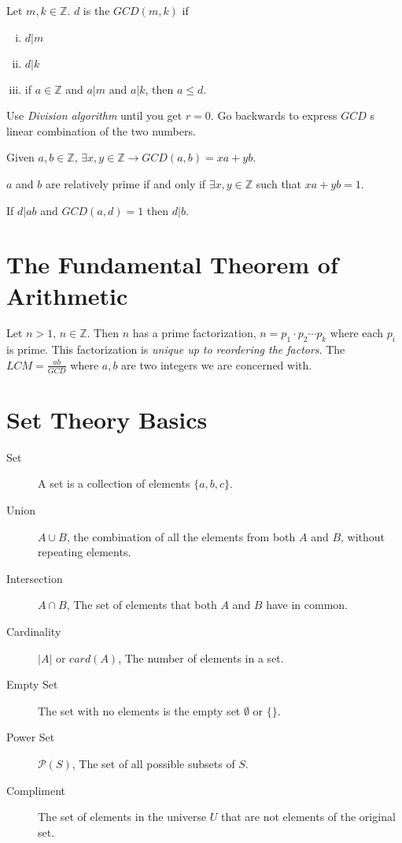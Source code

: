 \documentclass[../main.tex]{subfiles}
\begin{document}
\begin{description}
  \item[Definition] Let $m,k\in\mathbb{Z}$. $d$ is the $GCD(m,k)$ if
    \begin{enumerate}[(i)]
      \item $d|m$
      \item $d|k$
      \item if $a\in\mathbb{Z}$ and $a|m$ and $a|k$, then $a \leq d$.
    \end{enumerate}
  \item[Euclidean Algorithm] Use \textit{Division algorithm} until you get
    $r=0$. Go backwards to express $GCD$ s linear combination of the two
    numbers.
  \item[GCD pre-hammer] Given $a,b\in\mathbb{Z}$, $\exists x,y\in\mathbb{Z}\to
    GCD(a,b)=xa+yb$.
  \item[GCD hammer] $a$ and $b$ are relatively prime if and only if $\exists
    x,y\in\mathbb{Z}$ such that $xa+yb=1$.
  \item If $d|ab$ and $GCD(a,d)=1$ then $d|b$.
\end{description}

\section{The Fundamental Theorem of Arithmetic}
\label{sec:the_fundamental_theorem_of_arithmetic}

Let $n>1$, $n\in\mathbb{Z}$. Then $n$ has a prime factorization, $n=p_1\cdot
p_2\cdots p_k$ where each $p_i$ is prime. This factorization is \textit{unique
up to reordering the factors}. The $LCM = \frac{ab}{GCD}$ where $a,b$ are two
integers we are concerned with.

\section{Set Theory Basics}
\label{sec:set_theory_basics}

\begin{description}
  \item[Set] A set is a collection of elements $\{a, b, c\}$.
  \item[Union] $A\cup B$, the combination of all the elements from both $A$ and
    $B$, without repeating elements.
  \item[Intersection] $A\cap B$, The set of elements that both $A$ and $B$ have
    in common.
  \item[Cardinality] $|A|$ or $card(A)$, The number of elements in a set.
  \item[Empty Set] The set with no elements is the empty set $\emptyset$ or
    $\{\}$.
  \item[Power Set] $\mathcal{P}(S)$, The set of all possible subsets of $S$.
  \item[Compliment] The set of elements in the universe $U$ that are not
    elements of the original set.
\end{description}
\end{document}
